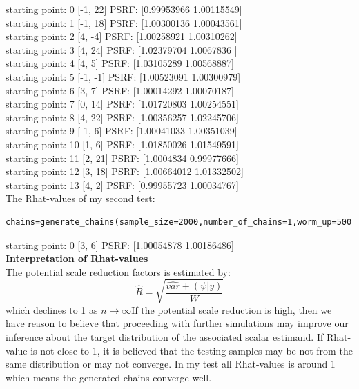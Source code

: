 \documentclass{article}
\begin{document}
starting point: 0 [-1, 22]  PSRF: [0.99953966 1.00115549]\\
starting point: 1 [-1, 18]  PSRF: [1.00300136 1.00043561]\\
starting point: 2 [4, -4]  PSRF: [1.00258921 1.00310262]\\
starting point: 3 [4, 24]  PSRF: [1.02379704 1.0067836 ]\\
starting point: 4 [4, 5]  PSRF: [1.03105289 1.00568887]\\
starting point: 5 [-1, -1]  PSRF: [1.00523091 1.00300979]\\
starting point: 6 [3, 7]  PSRF: [1.00014292 1.00070187]\\
starting point: 7 [0, 14]  PSRF: [1.01720803 1.00254551]\\
starting point: 8 [4, 22]  PSRF: [1.00356257 1.02245706]\\
starting point: 9 [-1, 6]  PSRF: [1.00041033 1.00351039]\\
starting point: 10 [1, 6]  PSRF: [1.01850026 1.01549591]\\
starting point: 11 [2, 21]  PSRF: [1.0004834  0.99977666]\\
starting point: 12 [3, 18]  PSRF: [1.00664012 1.01332502]\\
starting point: 13 [4, 2]  PSRF: [0.99955723 1.00034767]\\


The Rhat-values of my second test:
\begin{verbatim} 
chains=generate_chains(sample_size=2000,number_of_chains=1,worm_up=500)
\end{verbatim}

starting point: 0 [3, 6]  PSRF: [1.00054878 1.00186486]\\


\textbf{Interpretation of Rhat-values}\\

The potential scale reduction factors is estimated by:
\begin{equation}
\hat{R}=\sqrt{\frac{\hat{var}+(\psi|y)}{W}}
\end{equation}
which declines to 1 as $n\rightarrow \infty$If the potential scale reduction is high, then we have reason to believe that proceeding with further simulations may improve our inference about the target distribution of the associated scalar estimand. If Rhat-value is not close to 1, it is believed that the testing samples may be not from the same distribution or may not converge. In my test all Rhat-values is around 1 which means the generated chains converge well.\\
\end{document}
